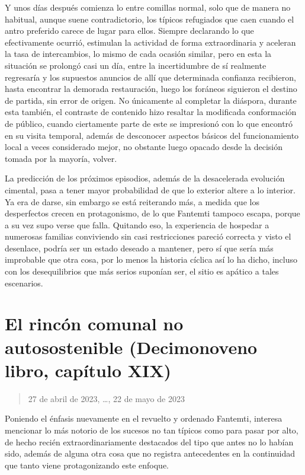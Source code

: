 \documentclass[
]{book}
\begin{document}
Y unos días después comienza lo entre comillas normal, solo que de manera no habitual, aunque suene contradictorio, los típicos refugiados que caen cuando el antro preferido carece de lugar para ellos. Siempre declarando lo que efectivamente ocurrió, estimulan la actividad de forma extraordinaria y aceleran la tasa de intercambios, lo mismo de cada ocasión similar, pero en esta la situación se prolongó casi un día, entre la incertidumbre de sí realmente regresaría y los supuestos anuncios de allí que determinada confianza recibieron, hasta encontrar la demorada restauración, luego los foráneos siguieron el destino de partida, sin error de origen. No únicamente al completar la diáspora, durante esta también, el contraste de contenido hizo resaltar la modificada conformación de público, cuando ciertamente parte de este se impresionó con lo que encontró en su visita temporal, además de desconocer aspectos básicos del funcionamiento local a veces considerado mejor, no obstante luego opacado desde la decisión tomada por la mayoría, volver.

La predicción de los próximos episodios, además de la desacelerada evolución cimental, pasa a tener mayor probabilidad de que lo exterior altere a lo interior. Ya era de darse, sin embargo se está reiterando más, a medida que los desperfectos crecen en protagonismo, de lo que Fantemti tampoco escapa, porque a su vez supo verse que falla. Quitando eso, la experiencia de hospedar a numerosas familias conviviendo sin casi restricciones pareció correcta y visto el desenlace, podría ser un estado deseado a mantener, pero sí que sería más improbable que otra cosa, por lo menos la historia cíclica así lo ha dicho, incluso con los desequilibrios que más serios suponían ser, el sitio es apático a tales escenarios.

\hypertarget{el-rincuxf3n-comunal-no-autosostenible-decimonoveno-libro-capuxedtulo-xix}{%
\section{El rincón comunal no autosostenible (Decimonoveno libro, capítulo XIX)}\label{el-rincuxf3n-comunal-no-autosostenible-decimonoveno-libro-capuxedtulo-xix}}

\begin{quote}
27 de abril de 2023, \ldots, 22 de mayo de 2023
\end{quote}

Poniendo el énfasis nuevamente en el revuelto y ordenado Fantemti, interesa mencionar lo más notorio de los sucesos no tan típicos como para pasar por alto, de hecho recién extraordinariamente destacados del tipo que antes no lo habían sido, además de alguna otra cosa que no registra antecedentes en la continuidad que tanto viene protagonizando este enfoque.
\end{document}
